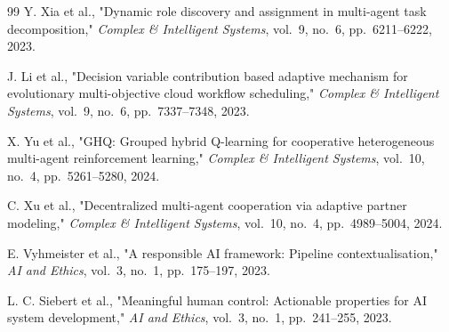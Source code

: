\documentclass[12pt,a4paper]{report}
\begin{document}
\begin{thebibliography}{99}
Y. Xia et al., "Dynamic role discovery and assignment in multi-agent task decomposition," \textit{Complex \& Intelligent Systems}, vol.~9, no.~6, pp.~6211--6222, 2023.

J. Li et al., "Decision variable contribution based adaptive mechanism for evolutionary multi-objective cloud workflow scheduling," \textit{Complex \& Intelligent Systems}, vol.~9, no.~6, pp.~7337--7348, 2023.

X. Yu et al., "GHQ: Grouped hybrid Q-learning for cooperative heterogeneous multi-agent reinforcement learning," \textit{Complex \& Intelligent Systems}, vol.~10, no.~4, pp.~5261--5280, 2024.

C. Xu et al., "Decentralized multi-agent cooperation via adaptive partner modeling," \textit{Complex \& Intelligent Systems}, vol.~10, no.~4, pp.~4989--5004, 2024.

E. Vyhmeister et al., "A responsible AI framework: Pipeline contextualisation," \textit{AI and Ethics}, vol.~3, no.~1, pp.~175--197, 2023.

L. C. Siebert et al., "Meaningful human control: Actionable properties for AI system development," \textit{AI and Ethics}, vol.~3, no.~1, pp.~241--255, 2023.


\end{thebibliography}
\end{document}
